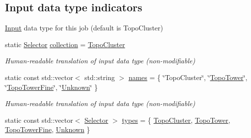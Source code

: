 \subsection*{Input data type indicators}
\label{_amgrp56599f4f4c9ceb6580b8aadff0ee7e3e}%
\hyperlink{namespaceAnalysis_1_1Config_1_1Input}{Input} data type for this job (default is {\ttfamily Topo\+Cluster}) \begin{DoxyCompactItemize}
\item 
static \hyperlink{namespaceAnalysis_1_1Config_1_1Input_a4fbe1ba2d37856e6b9784b4999d5268a}{Selector} \hyperlink{namespaceAnalysis_1_1Config_1_1Input_a768360b14e622980b67a7f09f524415c}{collection} = \hyperlink{namespaceAnalysis_1_1Config_1_1Input_a4fbe1ba2d37856e6b9784b4999d5268aa314665a30d375cd30c58b262159a7742}{Topo\+Cluster}
\begin{DoxyCompactList}\small\item\em Human-\/readable translation of input data type (non-\/modifiable) \end{DoxyCompactList}\item 
static const std\+::vector$<$ std\+::string $>$ \hyperlink{namespaceAnalysis_1_1Config_1_1Input_a91cee154e576aa79ee787627d6aca540}{names} = \{ \char`\"{}Topo\+Cluster\char`\"{}, \char`\"{}\hyperlink{namespaceAnalysis_1_1Config_1_1Input_a4fbe1ba2d37856e6b9784b4999d5268aaed118233c2f6356936e24cc848d97b64}{Topo\+Tower}\char`\"{}, \char`\"{}\hyperlink{namespaceAnalysis_1_1Config_1_1Input_a4fbe1ba2d37856e6b9784b4999d5268aa2180f436367feb0818a05ef720ff19a2}{Topo\+Tower\+Fine}\char`\"{}, \char`\"{}\hyperlink{namespaceAnalysis_1_1Config_1_1Input_a4fbe1ba2d37856e6b9784b4999d5268aa18e62acb2e8539c61f5a9a2cd005cd52}{Unknown}\char`\"{} \}
\begin{DoxyCompactList}\small\item\em Human-\/readable translation of input data type (non-\/modifiable) \end{DoxyCompactList}\item 
static const std\+::vector$<$ \hyperlink{namespaceAnalysis_1_1Config_1_1Input_a4fbe1ba2d37856e6b9784b4999d5268a}{Selector} $>$ \hyperlink{namespaceAnalysis_1_1Config_1_1Input_aad61028452c46869efe0b2dc1274a2b6}{types} = \{ \hyperlink{namespaceAnalysis_1_1Config_1_1Input_a4fbe1ba2d37856e6b9784b4999d5268aa314665a30d375cd30c58b262159a7742}{Topo\+Cluster}, \hyperlink{namespaceAnalysis_1_1Config_1_1Input_a4fbe1ba2d37856e6b9784b4999d5268aaed118233c2f6356936e24cc848d97b64}{Topo\+Tower}, \hyperlink{namespaceAnalysis_1_1Config_1_1Input_a4fbe1ba2d37856e6b9784b4999d5268aa2180f436367feb0818a05ef720ff19a2}{Topo\+Tower\+Fine}, \hyperlink{namespaceAnalysis_1_1Config_1_1Input_a4fbe1ba2d37856e6b9784b4999d5268aa18e62acb2e8539c61f5a9a2cd005cd52}{Unknown} \}

\end{DoxyCompactItemize}
